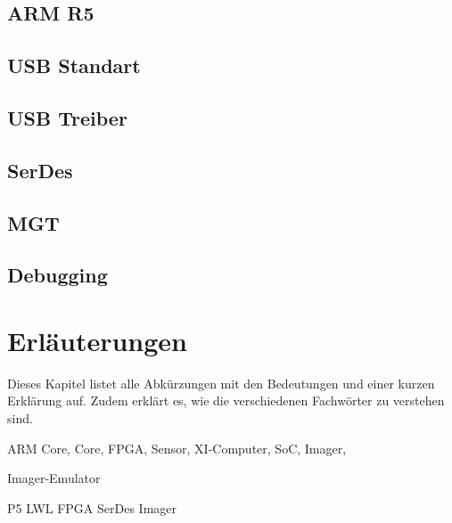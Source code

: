 \documentclass{article}
\begin{document}
\subsection{ARM R5}
\subsection{USB Standart}
\subsection{USB Treiber}
\subsection{SerDes}
\subsection{MGT}
\subsection{Debugging}

\section{Erläuterungen}
Dieses Kapitel listet alle Abkürzungen mit den Bedeutungen und einer kurzen Erklärung auf. Zudem erklärt es, wie die verschiedenen Fachwörter zu verstehen sind.

ARM Core,
Core,
FPGA,
Sensor,
XI-Computer,
SoC,
Imager,

Imager-Emulator

P5
LWL
FPGA
SerDes
Imager
\end{document}
